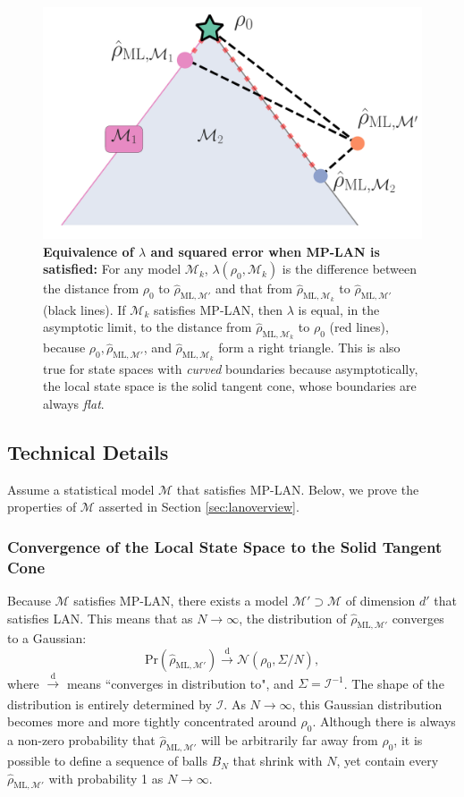 \documentclass[aps,pra, twocolumn]{revtex4-1}
\newcommand{\M}{\mathcal{M}}
\newcommand{\rhohat}{\hat{\rho}}
\newcommand{\rhoML}[1]{\rhohat_{\scriptscriptstyle{\mathrm{ML},#1}}}
\begin{document}
\begin{figure}
\includegraphics[width=.75\columnwidth]{Images/Figure_3.pdf}
 \caption{\textbf{Equivalence of $\lambda$ and squared error when MP-LAN is satisfied:} For any model $\M_{k}$, $\lambda(\rho_{0}, \M_{k})$ is the difference between the distance from $\rho_{0}$ to $\rhoML{\M'}$ and that from $\rhoML{\M_{k}}$ to $\rhoML{\M'}$ (black lines). If $\M_{k}$ satisfies MP-LAN, then $\lambda$ is equal, in the asymptotic limit, to the distance from $\rhoML{\M_{k}}$ to $\rho_{0}$ (red lines), because $\rho_{0}, \rhoML{\M'}$, and $\rhoML{\M_{k}}$ form a right triangle. This is also true for state spaces with \emph{curved} boundaries because asymptotically, the local state space is the solid tangent cone, whose boundaries are always \emph{flat}.}
\label{fig:llrs_MP-LAN}
\end{figure}

\subsection{Technical Details}

Assume a statistical model $\M$ that satisfies MP-LAN. Below, we prove the properties of $\M$ asserted in Section \ref{sec:lanoverview}. 

\subsubsection{Convergence of the Local State Space to the Solid Tangent Cone}

Because $\M$ satisfies MP-LAN, there exists a model $\M' \supset \M$ of dimension $d'$ that satisfies LAN. This means that as $N \rightarrow \infty$, the distribution of $\rhoML{\M'}$ converges to a Gaussian:
\[\mathrm{Pr}(\rhoML{\M'})\xrightarrow[]{\text{d}} \mathcal{N}(\rho_{0}, \Sigma/N),\]
where $\xrightarrow[]{\text{d}}$ means ``converges in distribution to", and $\Sigma = \mathcal{I}^{-1}$.
The shape of the distribution is entirely determined by $\mathcal{I}$. As $N \rightarrow \infty$, this Gaussian distribution becomes more and more tightly concentrated around $\rho_{0}$. Although there is always a non-zero probability that $\rhoML{\M'}$ will be arbitrarily far away from $\rho_{0}$, it is possible to define a sequence of balls $B_{N}$ that shrink with $N$, yet contain every $\rhoML{\M'}$ with probability 1 as $N \rightarrow \infty$.
\end{document}

